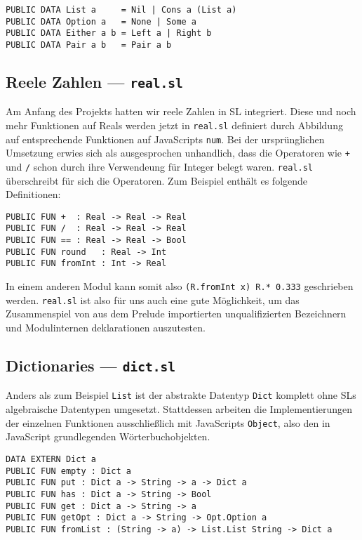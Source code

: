 \documentclass[runningheads]{llncs}
\begin{document}
\begin{verbatim}
PUBLIC DATA List a     = Nil | Cons a (List a)
PUBLIC DATA Option a   = None | Some a
PUBLIC DATA Either a b = Left a | Right b
PUBLIC DATA Pair a b   = Pair a b
\end{verbatim}

\subsection{Reele Zahlen --- \texttt{real.sl}}

Am Anfang des Projekts hatten wir reele Zahlen in SL integriert. Diese und
noch mehr Funktionen auf Reals werden jetzt in \verb|real.sl| definiert
durch Abbildung auf entsprechende Funktionen auf JavaScripts \verb|num|.
Bei der ursprünglichen Umsetzung erwies sich als ausgesprochen
unhandlich, dass die Operatoren wie \verb|+| und \verb|/| schon durch ihre
Verwendeung für Integer belegt waren. \verb|real.sl| überschreibt für sich
die Operatoren. Zum Beispiel enthält es folgende Definitionen:

\begin{verbatim}
PUBLIC FUN +  : Real -> Real -> Real
PUBLIC FUN /  : Real -> Real -> Real
PUBLIC FUN == : Real -> Real -> Bool
PUBLIC FUN round   : Real -> Int
PUBLIC FUN fromInt : Int -> Real
\end{verbatim}

In einem anderen Modul kann somit also \verb|(R.fromInt x) R.* 0.333|
geschrieben werden. \verb|real.sl| ist also für uns auch eine gute
Möglichkeit, um das Zusammenspiel von aus dem Prelude importierten
unqualifizierten Bezeichnern und Modulinternen deklarationen auszutesten.

\subsection{Dictionaries --- \texttt{dict.sl}}

Anders als zum Beispiel \verb|List| ist der abstrakte Datentyp \verb|Dict|
komplett ohne SLs algebraische Datentypen umgesetzt. Stattdessen arbeiten
die Implementierungen der einzelnen Funktionen ausschließlich mit JavaScripts
\verb|Object|, also den in JavaScript grundlegenden Wörterbuchobjekten.

\begin{verbatim}
DATA EXTERN Dict a
PUBLIC FUN empty : Dict a
PUBLIC FUN put : Dict a -> String -> a -> Dict a
PUBLIC FUN has : Dict a -> String -> Bool
PUBLIC FUN get : Dict a -> String -> a
PUBLIC FUN getOpt : Dict a -> String -> Opt.Option a
PUBLIC FUN fromList : (String -> a) -> List.List String -> Dict a
\end{verbatim}
\end{document}
